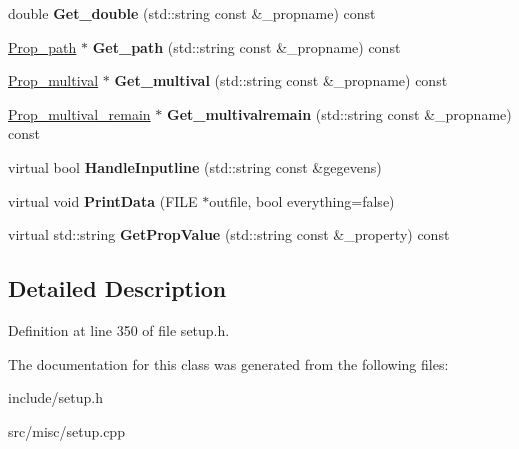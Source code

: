 \begin{DoxyCompactItemize}
\item 
\hypertarget{classSection__prop_ac7dd360e460d869bdcaa531693249a22}{double {\bfseries Get\-\_\-double} (std\-::string const \&\-\_\-propname) const }\label{classSection__prop_ac7dd360e460d869bdcaa531693249a22}

\item 
\hypertarget{classSection__prop_a8522e241de9dfcf71331b6f1dbc16841}{\hyperlink{classProp__path}{Prop\-\_\-path} $\ast$ {\bfseries Get\-\_\-path} (std\-::string const \&\-\_\-propname) const }\label{classSection__prop_a8522e241de9dfcf71331b6f1dbc16841}

\item 
\hypertarget{classSection__prop_a4471da0d01d645126b419f3698b2975c}{\hyperlink{classProp__multival}{Prop\-\_\-multival} $\ast$ {\bfseries Get\-\_\-multival} (std\-::string const \&\-\_\-propname) const }\label{classSection__prop_a4471da0d01d645126b419f3698b2975c}

\item 
\hypertarget{classSection__prop_abbb6160985f12a56526911ab1de6f8ed}{\hyperlink{classProp__multival__remain}{Prop\-\_\-multival\-\_\-remain} $\ast$ {\bfseries Get\-\_\-multivalremain} (std\-::string const \&\-\_\-propname) const }\label{classSection__prop_abbb6160985f12a56526911ab1de6f8ed}

\item 
\hypertarget{classSection__prop_aa18fa3fb45cdc41e54a15f1416a43914}{virtual bool {\bfseries Handle\-Inputline} (std\-::string const \&gegevens)}\label{classSection__prop_aa18fa3fb45cdc41e54a15f1416a43914}

\item 
\hypertarget{classSection__prop_aa49bc0d729b288d862e1db9cfc6e107c}{virtual void {\bfseries Print\-Data} (F\-I\-L\-E $\ast$outfile, bool everything=false)}\label{classSection__prop_aa49bc0d729b288d862e1db9cfc6e107c}

\item 
\hypertarget{classSection__prop_a6b6444bff385109361d271103aafdd4e}{virtual std\-::string {\bfseries Get\-Prop\-Value} (std\-::string const \&\-\_\-property) const }\label{classSection__prop_a6b6444bff385109361d271103aafdd4e}

\end{DoxyCompactItemize}


\subsection{Detailed Description}


Definition at line 350 of file setup.\-h.



The documentation for this class was generated from the following files\-:\begin{DoxyCompactItemize}
\item 
include/setup.\-h\item 
src/misc/setup.\-cpp\end{DoxyCompactItemize}
